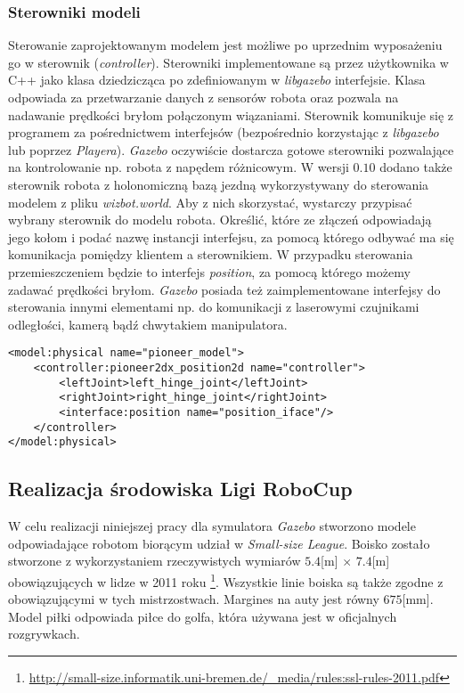 	\subsubsection{Sterowniki modeli }
	Sterowanie zaprojektowanym modelem jest możliwe po uprzednim wyposażeniu go w sterownik (\textit{controller}). Sterowniki implementowane są przez użytkownika w C++ jako klasa dziedzicząca
	po zdefiniowanym w \textit{libgazebo} interfejsie. Klasa odpowiada za przetwarzanie danych z sensorów robota oraz pozwala
	na nadawanie prędkości bryłom połączonym wiązaniami. Sterownik komunikuje się z programem za pośrednictwem interfejsów (bezpośrednio korzystając z \textit{libgazebo} lub poprzez \textit{Playera}).
	\textit{Gazebo} oczywiście dostarcza gotowe sterowniki pozwalające na kontrolowanie np. robota z napędem różnicowym. W wersji $0.10$ dodano także sterownik robota z holonomiczną bazą jezdną wykorzystywany
	do sterowania modelem z pliku \textit{wizbot.world}. Aby z nich skorzystać, wystarczy przypisać wybrany sterownik do modelu robota. Określić, które ze złączeń odpowiadają jego kołom i podać nazwę instancji interfejsu,
	za pomocą którego odbywać ma się komunikacja pomiędzy klientem a sterownikiem. W przypadku sterowania przemieszczeniem będzie to interfejs \textit{position}, za pomocą którego możemy zadawać prędkości bryłom.
	\textit{Gazebo} posiada też zaimplementowane interfejsy do sterowania innymi elementami np. do komunikacji z laserowymi czujnikami odległości, kamerą bądź chwytakiem manipulatora. 
	\begin{lstlisting}
<model:physical name="pioneer_model">
    <controller:pioneer2dx_position2d name="controller">
        <leftJoint>left_hinge_joint</leftJoint>
        <rightJoint>right_hinge_joint</rightJoint>
        <interface:position name="position_iface"/>
    </controller>
</model:physical>
	\end{lstlisting}	

	
	\subsection{Realizacja środowiska Ligi RoboCup \label{subsect:realizacjaROBOCUP} }
	
	W celu realizacji niniejszej pracy dla symulatora \textit{Gazebo} stworzono modele odpowiadające robotom biorącym udział w \emph{Small-size League}. 
	Boisko zostało stworzone z wykorzystaniem rzeczywistych wymiarów $5.4$[m] $\times$ $7.4$[m] obowiązujących w lidze w 2011 roku 
	\protect\footnote{\url{http://small-size.informatik.uni-bremen.de/_media/rules:ssl-rules-2011.pdf}}. Wszystkie linie boiska są także zgodne z obowiązującymi w tych mistrzostwach.
	Margines na auty jest równy $675$[mm].
	Model piłki odpowiada piłce do golfa, która używana jest w oficjalnych rozgrywkach.

